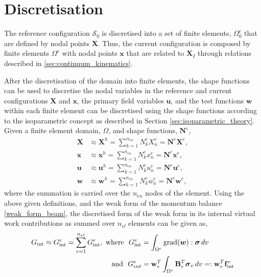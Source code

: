 \section{Discretisation} \label{sec:nonlinear_discretisation}
The reference configuration $\mathcal{S}_{0}$ is discretised into a set of finite elements, $\Omega_{0}^{e}$ that are defined by nodal points
 $\boldsymbol{X}$. Thus, the current configuration is composed by finite elements $\Omega^{e}$ with nodal points $\boldsymbol{x}$
 that are related to $\boldsymbol{X}_{I}$ through relations described in \ref{sec:continuum_kinematics}. 

After the discretisation of the domain into finite elements, the shape functions can be used to discretise the nodal variables
 in the reference and current configurations $\boldsymbol{X}$ and $\boldsymbol{x}$, the primary field variables $\boldsymbol{u}$,
 and the test functions $\boldsymbol{w}$ within each finite element can be discretised using the shape functions according to the isoparametric concept
 as described in Section \ref{sec:isoparametric_theory}. 
 Given a finite element domain, $\Omega$, and shape functions, $\boldsymbol{N}^{e}$,
 \begin{align} \label{nodal_discretisations}
    \boldsymbol{X} &\approx \boldsymbol{X}^{h} = \sum^{n_{en}}_{k=1} N^{e}_{k} X^{e}_{n} = \mathbf{N}^{e}\mathbf{X}^{e},\\
    \boldsymbol{x} &\approx \boldsymbol{x}^{h} = \sum^{n_{en}}_{k=1} N^{e}_{k} x^{e}_{n} = \mathbf{N}^{e}\mathbf{x}^{e},\\
    \boldsymbol{u} &\approx \boldsymbol{u}^{h} = \sum^{n_{en}}_{k=1} N^{e}_{k} u^{e}_{n} = \mathbf{N}^{e}\mathbf{u}^{e},\\
    \boldsymbol{w} &\approx \boldsymbol{w}^{h} = \sum^{n_{en}}_{k=1} N^{e}_{k} w^{e}_{n} = \mathbf{N}^{e}\mathbf{w}^{e},
 \end{align}
where the summation is carried over the $n_{en}$ nodes of the element. 
Using the above given definitions, and the weak form of the momentum balance \eqref{weak_form_beam}, the discretised form of the weak form
 in its internal virtual work contributions as summed over $n_{el}$ elements can be given as,
\begin{align} \label{discretised_g_int}
    G_{\text{int}} \approx G^{e}_{\text{int}} = \sum^{n_{el}}_{e=1} G^{e}_{\text{int}}, \,\,\text{where } \, \, G^{e}_{\text{int}} &= \int_{\Omega^{e}} \mathrm{grad}(\boldsymbol{w}) : \boldsymbol{\sigma} \,dv \notag\\
    \text{and }\,\, G^{e}_{int} &= \mathbf{w}^{T}_{e} \int_{\Omega^{e}}{\mathbf{B}^{T}_{e}} \boldsymbol{\sigma}_{v} \,dv =: \mathbf{w}^{T}_{e} \mathbf{f}^{e}_{\text{int}}
\end{align}
